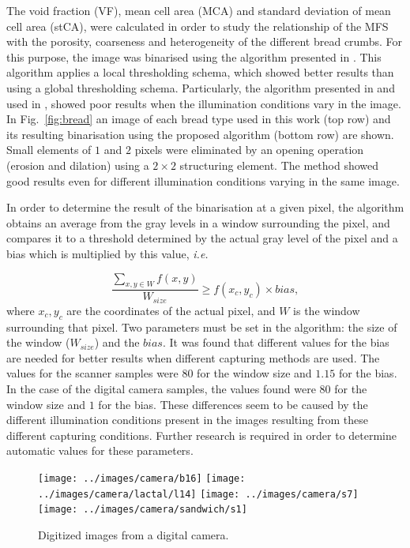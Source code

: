 The void fraction (VF), mean cell area (MCA) and standard deviation of mean cell area (stCA), were calculated in order to study the relationship of the MFS with the porosity, coarseness and heterogeneity of the different bread crumbs. For this purpose, the image was binarised using the algorithm presented in \cite{White83}. This algorithm applies a local thresholding schema, which showed better results than using a global thresholding schema. Particularly, the algorithm presented in \cite{Huang95} and used in \cite{Gonzales2008}, showed poor results when the illumination conditions vary in the image. In Fig.~\ref{fig:bread} an image of each bread type used in this work (top row) and its resulting binarisation using the proposed algorithm (bottom row) are shown. Small elements of $1$ and $2$ pixels were eliminated by an opening operation (erosion and dilation) using a $2\times2$ structuring element. The method showed good results even for different illumination conditions varying in the same image. 

In order to determine the result of the binarisation at a given pixel, the algorithm obtains an average from the gray levels in a window surrounding the pixel, and compares it to a threshold determined by the actual gray level of the pixel and a bias which is multiplied by this value, {\em i.e.}

\begin{equation}
\frac{\sum_{x,y \in W} f(x,y) }{W_{size}} \geq f(x_{c},y_{c}) \times bias,
\label{eqn:white}
\end{equation}
where $x_{c},y_{c}$ are the coordinates of the actual pixel, and $W$ is the window surrounding that pixel. Two parameters must be set in the algorithm: the size of the window ($W_{size}$) and the $bias$. It was found that different values for the bias are needed for better results when different capturing methods are used. The values for the scanner samples were $80$ for the window size and $1.15$ for the bias. In the case of the digital camera samples, the values found were $80$ for the window size and $1$ for the bias. These differences seem to be caused by the different illumination conditions present in the images resulting from these different capturing conditions. Further research is required in order to determine automatic values for these parameters.

\begin{figure}[htb]
\centering
\texttt{[image: ../images/camera/b16]}
\texttt{[image: ../images/camera/lactal/l14]}
\texttt{[image: ../images/camera/s7]}
\texttt{[image: ../images/camera/sandwich/s1]}
\caption{Digitized images from a digital camera.}
\label{fig:camera}
\end{figure}


